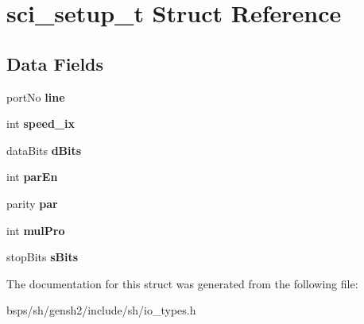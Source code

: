 \hypertarget{structsci__setup__t}{}\section{sci\+\_\+setup\+\_\+t Struct Reference}
\label{structsci__setup__t}
\subsection*{Data Fields}
\begin{DoxyCompactItemize}
\item 
\mbox{\label{structsci__setup__t_a2eb4ed166b45c6206534041d2b336186}} 
port\+No {\bfseries line}
\item 
\mbox{\label{structsci__setup__t_a4030961235a3419afd50113cf6d0b91e}} 
int {\bfseries speed\+\_\+ix}
\item 
\mbox{\label{structsci__setup__t_a9924669221a35352f74b63754c57ee67}} 
data\+Bits {\bfseries d\+Bits}
\item 
\mbox{\label{structsci__setup__t_a3b21a8c2629286a005b707a301085e95}} 
int {\bfseries par\+En}
\item 
\mbox{\label{structsci__setup__t_affd3a8e9539f31b129b5bdb2f727f47e}} 
parity {\bfseries par}
\item 
\mbox{\label{structsci__setup__t_ac3427c7d3a8f6688f838ebfe113f7376}} 
int {\bfseries mul\+Pro}
\item 
\mbox{\label{structsci__setup__t_a9b8af29f9fd59877b88915d679c82181}} 
stop\+Bits {\bfseries s\+Bits}
\end{DoxyCompactItemize}


The documentation for this struct was generated from the following file\+:\begin{DoxyCompactItemize}
\item 
bsps/sh/gensh2/include/sh/io\+\_\+types.\+h\end{DoxyCompactItemize}
